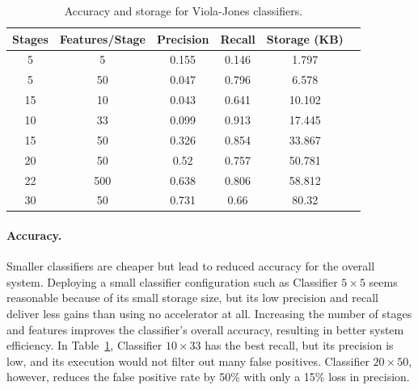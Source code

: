 \begin{table}[h]
  \centering
\begin{tabular}{cccccc}
\hline
Stages  & Features/Stage  & Precision & Recall & Storage (KB)  \\ \hline
5       &       5         & 0.155     & 0.146  & 1.797         \\
5     &         50        & 0.047     & 0.796  & 6.578        \\
15    &         10       & 0.043     & 0.641  & 10.102     \\
10    &         33       & 0.099     & 0.913  & 17.445     \\
15    &         50       & 0.326     & 0.854  & 33.867         \\
20    &         50       & 0.52      & 0.757  & 50.781      \\
22    &         500      & 0.638     & 0.806  & 58.812     \\
30    &         50       & 0.731     & 0.66   & 80.32      \\
\hline
\end{tabular}

\caption{Accuracy and storage for Viola-Jones classifiers.}
\label{table:vj-clsfr-sizes}
\end{table}



\paragraph{Accuracy.}
Smaller classifiers are cheaper but lead to reduced accuracy
for the overall system.
Deploying a small classifier configuration such as Classifier $5\times 5$ seems reasonable
because of its small storage size, but its low
precision and recall deliver less gains than using no accelerator at all. Increasing
the number of stages and features improves the classifier's overall accuracy, resulting
in better system efficiency. In Table~\ref{table:vj-clsfr-sizes},
Classifier $10\times 33$ has the best recall, but its precision
is low, and its execution would not filter out many false positives. Classifier
$20\times 50$, however, reduces the false positive rate by 50\% with only a 15\% loss in precision.

